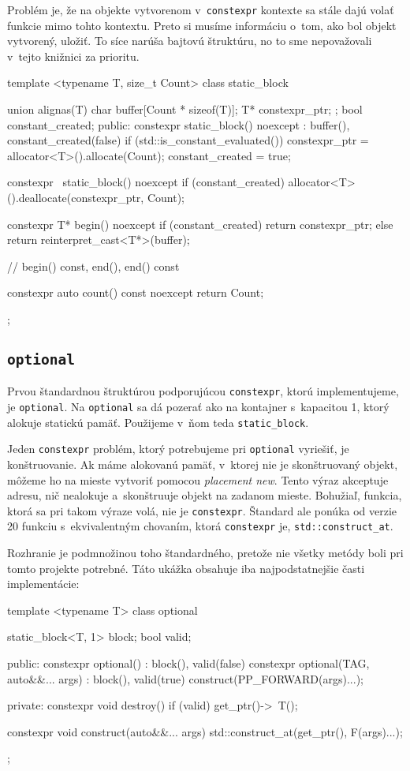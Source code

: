 Problém je, že na objekte vytvorenom v~\texttt{constexpr} kontexte sa stále dajú volať funkcie mimo tohto kontextu. Preto si musíme informáciu o~tom, ako bol objekt vytvorený, uložiť. To síce narúša bajtovú štruktúru, no to sme nepovažovali v~tejto knižnici za prioritu.
\begin{code}[fontsize=\footnotesize]
template <typename T, size_t Count>
class static_block
{   union { alignas(T) char buffer[Count * sizeof(T)];
            T* constexpr_ptr; };
    bool constant_created;
public:
    constexpr static_block() noexcept : buffer(), constant_created(false)
    {   if (std::is_constant_evaluated())
        {   constexpr_ptr = allocator<T>().allocate(Count);
            constant_created = true; } }
        
    constexpr ~static_block() noexcept
    {   if (constant_created)
            allocator<T>().deallocate(constexpr_ptr, Count); }

    constexpr T* begin() noexcept
    {   if (constant_created) return constexpr_ptr;
        else                  return reinterpret_cast<T*>(buffer); }
    
    // begin() const, end(), end() const
    
    constexpr auto count() const noexcept { return Count; } };
\end{code}

\subsection{\texttt{optional}}

Prvou štandardnou štruktúrou podporujúcou \texttt{constexpr}, ktorú implementujeme, je \texttt{optional}. Na \texttt{optional} sa dá pozerať ako na kontajner s~kapacitou 1, ktorý alokuje statickú pamäť. Použijeme v~ňom teda \texttt{static\_block}.

Jeden \texttt{constexpr} problém, ktorý potrebujeme pri \texttt{optional} vyriešiť, je konštruovanie. Ak máme alokovanú pamäť, v~ktorej nie je skonštruovaný objekt, môžeme ho na mieste vytvoriť pomocou \emph{placement new}. Tento výraz akceptuje adresu, nič nealokuje a~skonštruuje objekt na zadanom mieste. Bohužiaľ, funkcia, ktorá sa pri takom výraze volá, nie je \texttt{constexpr}. Štandard ale ponúka od verzie \Cpp{}20 funkciu s~ekvivalentným chovaním, ktorá \texttt{constexpr} je, \texttt{std::construct\_at}.

Rozhranie je podmnožinou toho štandardného, pretože nie všetky metódy boli pri tomto projekte potrebné. Táto ukážka obsahuje iba najpodstatnejšie časti implementácie:
\begin{code}[fontsize=\footnotesize]
template <typename T>
class optional
{   static_block<T, 1> block;
    bool valid;

public:
    constexpr optional() : block(), valid(false) {}
    constexpr optional(TAG, auto&&... args) : block(), valid(true)
    { construct(PP_FORWARD(args)...); }
    
private:
    constexpr void destroy() { if (valid) get_ptr()->~T(); }

    constexpr void construct(auto&&... args)
    { std::construct_at(get_ptr(), F(args)...); } };
\end{code}


